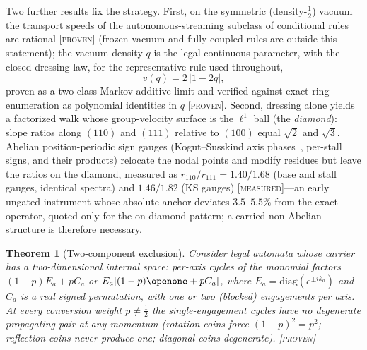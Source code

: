 \documentclass[aps,prd,twocolumn,superscriptaddress,nofootinbib,floatfix]{revtex4-2}
\newtheorem{theorem}{Theorem}
\newcommand{\evP}{\textnormal{\textsc{[proven]}}}
\newcommand{\evX}{\textnormal{\textsc{[measured]}}}
\begin{document}
Two further results fix the strategy. First, on the symmetric
(density-$\tfrac12$) vacuum the transport speeds of the
autonomous-streaming subclass of conditional rules~\cite{Wetterich2022b}
are rational \evP{} (frozen-vacuum and fully coupled rules are outside
this statement); the vacuum density $q$ is
the legal continuous parameter, with the closed dressing law, for the
representative rule used throughout,
\begin{equation}
v(q) = 2\,|1-2q| ,
\label{eq:vq}
\end{equation}
proven as a two-class Markov-additive limit and verified against exact ring
enumeration as polynomial identities in $q$ \evP{}. Second, dressing alone
yields a factorized walk whose group-velocity surface is the $\ell^1$ ball
(the \emph{diamond}): slope ratios along $(110)$ and $(111)$ relative to
$(100)$ equal $\sqrt2$ and $\sqrt3$. Abelian position-periodic sign gauges
(Kogut--Susskind axis phases~\cite{KogutSusskind,Susskind}, per-stall signs, and
their products) relocate the nodal points and modify residues but leave the
ratios on the diamond, measured as
$r_{110}/r_{111}=1.40/1.68$ (base and stall gauges, identical spectra) and
$1.46/1.82$ (KS gauges) \evX{}---an early ungated instrument whose absolute
anchor deviates $3.5$--$5.5\%$ from the exact operator, quoted only for the
on-diamond pattern; a carried non-Abelian structure is therefore necessary.

\begin{theorem}[Two-component exclusion]\label{thm:ntwo}
Consider legal automata whose carrier has a two-dimensional internal
space: per-axis cycles of the monomial factors $(1-p)E_a+pC_a$ or
$E_a[(1-p)\openone+pC_a]$, where $E_a=\mathrm{diag}(e^{\pm ik_a})$ and
$C_a$ is a real signed permutation, with one or two (blocked)
engagements per axis.
At every conversion weight $p\neq\tfrac12$ the single-engagement
cycles have no degenerate propagating pair at any momentum (rotation
coins force $(1-p)^2=p^2$; reflection coins never produce one; diagonal
coins degenerate). \evP{}
\end{theorem}
\end{document}
